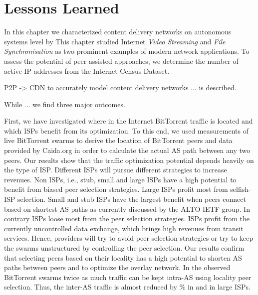 \section{Lessons Learned}\label{sec:application:lessons_learned}
In this chapter we characterized content delivery networks on autonomous systems level by This chapter studied Internet \emph{Video Streaming} and \emph{File Synchronisation} as two prominent examples of modern network applications.
To assess the potential of peer assisted approaches, we determine the number of active IP-addresses from the Internet Census Dataset.

P2P -> CDN
to accurately model content delivery networks ... is described.

While ... we find three major outcomes.

First, we have investigated where in the Internet BitTorrent traffic is located and which ISPs benefit from its optimization. To this end, we used measurements of live BitTorrent swarms to derive the location of BitTorrent peers and data provided by Caida.org in order to calculate the actual AS path between any two peers.
Our results show that the traffic optimization potential depends heavily on the type of ISP. Different ISPs will pursue different strategies to increase revenues. Non \tier ISPs, i.e., stub, small and large ISPs have a high potential to benefit from biased peer selection strategies. Large ISPs profit most from selfish-ISP selection. Small and stub ISPs have the largest benefit when peers connect based on shortest AS paths as currently discussed by the ALTO IETF group. In contrary \tier ISPs loose most from the peer selection strategies. \Tier ISPs profit from the currently uncontrolled data exchange, which brings high revenues from transit services. Hence, \tier providers will try to avoid peer selection strategies or try to keep the swarms unstructured by controlling the peer selection.
Our results confirm that selecting peers based on their locality has a high potential to shorten AS paths between peers and to optimize the overlay network. In the observed BitTorrent swarms twice as much traffic can be kept intra-AS using locality peer selection. Thus, the inter-AS traffic is almost reduced by \unit[50]{\%} in \tier and in large ISPs.

